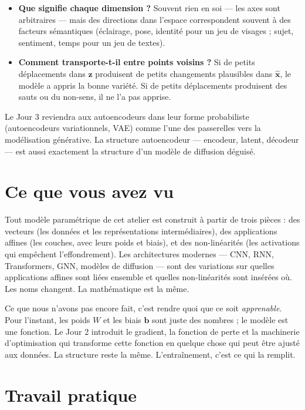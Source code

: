 \begin{itemize}
  \item \textbf{Que signifie chaque dimension ?} Souvent rien en soi --- les axes sont arbitraires --- mais des directions dans l'espace correspondent souvent à des facteurs sémantiques (éclairage, pose, identité pour un jeu de visages ; sujet, sentiment, temps pour un jeu de textes).
  \item \textbf{Comment transporte-t-il entre points voisins ?} Si de petits déplacements dans $\bm{z}$ produisent de petits changements plausibles dans $\hat{\bm{x}}$, le modèle a appris la bonne variété. Si de petits déplacements produisent des sauts ou du non-sens, il ne l'a pas apprise.
\end{itemize}

Le Jour 3 reviendra aux autoencodeurs dans leur forme probabiliste (autoencodeurs variationnels, VAE) comme l'une des passerelles vers la modélisation générative. La structure autoencodeur --- encodeur, latent, décodeur --- est aussi exactement la structure d'un modèle de diffusion déguisé.

\section{Ce que vous avez vu}

Tout modèle paramétrique de cet atelier est construit à partir de trois pièces : des vecteurs (les données et les représentations intermédiaires), des applications affines (les couches, avec leurs poids et biais), et des non-linéarités (les activations qui empêchent l'effondrement). Les architectures modernes --- CNN, RNN, Transformers, GNN, modèles de diffusion --- sont des variations sur quelles applications affines sont liées ensemble et quelles non-linéarités sont insérées où. Les noms changent. La mathématique est la même.

Ce que nous n'avons pas encore fait, c'est rendre quoi que ce soit \emph{apprenable}. Pour l'instant, les poids $W$ et les biais $\bm{b}$ sont juste des nombres ; le modèle est une fonction. Le Jour 2 introduit le gradient, la fonction de perte et la machinerie d'optimisation qui transforme cette fonction en quelque chose qui peut être ajusté aux données. La structure reste la même. L'entraînement, c'est ce qui la remplit.

\section*{Travail pratique}

